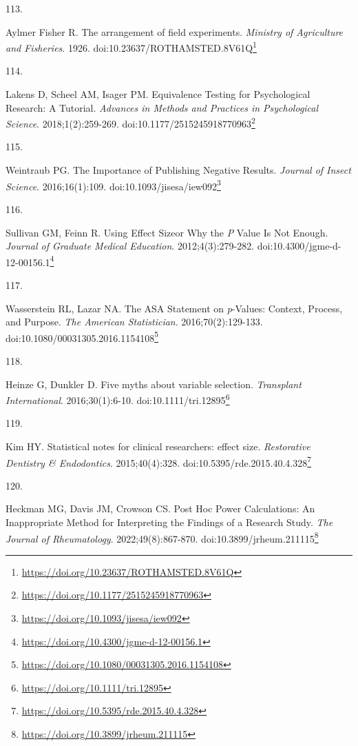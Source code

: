 \documentclass[
  a4paper,
]{book}
\newlength{\cslhangindent}
\newlength{\csllabelwidth}
\newlength{\cslentryspacingunit} %
\newenvironment{CSLReferences}[2] %
 {%
  \setlength{\parindent}{0pt}
  \ifodd #1
  \let\oldpar\par
  \def\par{\hangindent=\cslhangindent\oldpar}
  \fi
  \setlength{\parskip}{#2\cslentryspacingunit}
 }%
 {}
\newcommand{\CSLLeftMargin}[1]{\parbox[t]{\csllabelwidth}{#1}}
\newcommand{\CSLRightInline}[1]{\parbox[t]{\linewidth - \csllabelwidth}{#1}\break}
\renewcommand{\href}[2]{#2\footnote{\url{#1}}}
\begin{document}
\begin{CSLReferences}{0}{0}
\leavevmode{}%
\CSLLeftMargin{113. }%
\CSLRightInline{Aylmer Fisher R. The arrangement of field experiments. \emph{Ministry of Agriculture and Fisheries}. 1926. doi:\href{https://doi.org/10.23637/ROTHAMSTED.8V61Q}{10.23637/ROTHAMSTED.8V61Q}}

\leavevmode{}%
\CSLLeftMargin{114. }%
\CSLRightInline{Lakens D, Scheel AM, Isager PM. Equivalence Testing for Psychological Research: A Tutorial. \emph{Advances in Methods and Practices in Psychological Science}. 2018;1(2):259-269. doi:\href{https://doi.org/10.1177/2515245918770963}{10.1177/2515245918770963}}

\leavevmode{}%
\CSLLeftMargin{115. }%
\CSLRightInline{Weintraub PG. The Importance of Publishing Negative Results. \emph{Journal of Insect Science}. 2016;16(1):109. doi:\href{https://doi.org/10.1093/jisesa/iew092}{10.1093/jisesa/iew092}}

\leavevmode{}%
\CSLLeftMargin{116. }%
\CSLRightInline{Sullivan GM, Feinn R. Using Effect Size{\textemdash}or Why the {\emph{P}} Value Is Not Enough. \emph{Journal of Graduate Medical Education}. 2012;4(3):279-282. doi:\href{https://doi.org/10.4300/jgme-d-12-00156.1}{10.4300/jgme-d-12-00156.1}}

\leavevmode{}%
\CSLLeftMargin{117. }%
\CSLRightInline{Wasserstein RL, Lazar NA. The ASA Statement on {\emph{p}}-Values: Context, Process, and Purpose. \emph{The American Statistician}. 2016;70(2):129-133. doi:\href{https://doi.org/10.1080/00031305.2016.1154108}{10.1080/00031305.2016.1154108}}

\leavevmode{}%
\CSLLeftMargin{118. }%
\CSLRightInline{Heinze G, Dunkler D. Five myths about variable selection. \emph{Transplant International}. 2016;30(1):6-10. doi:\href{https://doi.org/10.1111/tri.12895}{10.1111/tri.12895}}

\leavevmode{}%
\CSLLeftMargin{119. }%
\CSLRightInline{Kim HY. Statistical notes for clinical researchers: effect size. \emph{Restorative Dentistry \& Endodontics}. 2015;40(4):328. doi:\href{https://doi.org/10.5395/rde.2015.40.4.328}{10.5395/rde.2015.40.4.328}}

\leavevmode{}%
\CSLLeftMargin{120. }%
\CSLRightInline{Heckman MG, Davis JM, Crowson CS. Post Hoc Power Calculations: An Inappropriate Method for Interpreting the Findings of a Research Study. \emph{The Journal of Rheumatology}. 2022;49(8):867-870. doi:\href{https://doi.org/10.3899/jrheum.211115}{10.3899/jrheum.211115}}


\end{CSLReferences}
\end{document}
